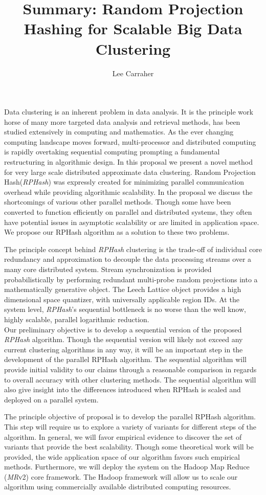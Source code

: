 \documentclass[a4paper,11pt]{article}
\title{Summary: Random Projection Hashing for Scalable Big Data Clustering}
\author{Lee Carraher}
\begin{document}
 Data clustering is
 an inherent problem in data analysis. It is the principle work horse of many more targeted data analysis and retrieval methods,
 has been studied extensively in computing and mathematics. As the ever changing computing landscape moves forward, multi-processor
 and distributed computing is rapidly overtaking sequential computing prompting a fundamental restructuring in algorithmic design.
 In this proposal we present a novel method for very large scale distributed approximate data clustering.
 Random Projection Hash(\emph{RPHash}) was expressly created for minimizing parallel communication overhead while providing
 algorithmic scalability. In the proposal we discuss the shortcomings of various other parallel methods. Though some 
 have been converted to function efficiently on parallel and distributed systems, they often have potential issues 
 in asymptotic scalability or are limited in application space. We propose our RPHash algorithm as a solution to these
 two problems.
 
 The principle concept behind \emph{RPHash} clustering is the trade-off of individual core redundancy and approximation to
 decouple the data processing streams over a many core distributed system. 
 Stream synchronization is provided probabilistically by performing 
 redundant multi-probe random projections into a mathematically generative object. The Leech Lattice object provides a
 high dimensional space quantizer, with universally applicable region IDs. At the system level, \emph{RPHash}'s 
 sequential bottleneck is no worse than the well know, highly scalable, parallel logarithmic reduction.\\
 Our preliminary objective is to develop a sequential version of the proposed \emph{RPHash} algorithm. Though the 
 sequential version will likely not exceed any current clustering algorithms in any way, it will be an important 
 step in the development of the parallel RPHash algorithm. The sequential algorithm will provide initial validity 
 to our claims through a reasonable comparison in regards to overall accuracy with other clustering methods. The 
 sequential algorithm will also give insight into the differences introduced when RPHash is scaled and deployed 
 on a parallel system.

 The principle objective of proposal is to develop the parallel RPHash algorithm. This step will require us to explore
 a variety of variants for different steps of the algorithm. In general, we will favor
 empirical evidence to discover the set of variants that provide the best scalability. Though some theoretical work
 will be provided, the wide application space of our algorithm favors such empirical methods.
 Furthermore, we will deploy the system on
 the Hadoop Map Reduce (\emph{MR}v2) core framework. The Hadoop framework will allow us to scale our algorithm using 
 commercially available distributed computing resources. 
 
\end{document}
